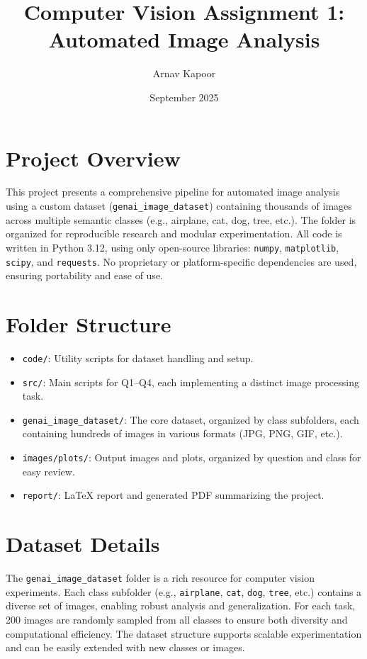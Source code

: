 \documentclass[11pt,a4paper]{article}
\title{Computer Vision Assignment 1: Automated Image Analysis}
\author{Arnav Kapoor}
\date{September 2025}
\begin{document}
\maketitle

\section*{Project Overview}
This project presents a comprehensive pipeline for automated image analysis using a custom dataset (\texttt{genai\_image\_dataset}) containing thousands of images across multiple semantic classes (e.g., airplane, cat, dog, tree, etc.). The folder is organized for reproducible research and modular experimentation. All code is written in Python 3.12, using only open-source libraries: \texttt{numpy}, \texttt{matplotlib}, \texttt{scipy}, and \texttt{requests}. No proprietary or platform-specific dependencies are used, ensuring portability and ease of use.

\section*{Folder Structure}
\begin{itemize}
  \item \texttt{code/}: Utility scripts for dataset handling and setup.
  \item \texttt{src/}: Main scripts for Q1--Q4, each implementing a distinct image processing task.
  \item \texttt{genai\_image\_dataset/}: The core dataset, organized by class subfolders, each containing hundreds of images in various formats (JPG, PNG, GIF, etc.).
  \item \texttt{images/plots/}: Output images and plots, organized by question and class for easy review.
  \item \texttt{report/}: LaTeX report and generated PDF summarizing the project.
\end{itemize}

\section*{Dataset Details}
The \texttt{genai\_image\_dataset} folder is a rich resource for computer vision experiments. Each class subfolder (e.g., \texttt{airplane}, \texttt{cat}, \texttt{dog}, \texttt{tree}, etc.) contains a diverse set of images, enabling robust analysis and generalization. For each task, 200 images are randomly sampled from all classes to ensure both diversity and computational efficiency. The dataset structure supports scalable experimentation and can be easily extended with new classes or images.
\end{document}

